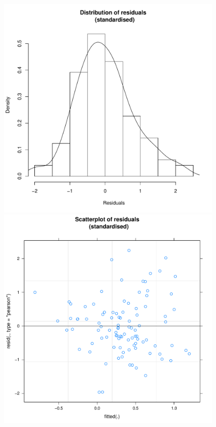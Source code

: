 \begin{CJK}{UTF8}{gbsn}

      





      \begin{figure}[!htbp]
        \includegraphics[scale =.4]{images/MLM23aHist.pdf}
        \includegraphics[scale =.4]{images/MLM23aScatter.pdf}

\end{figure}
\end{CJK}
